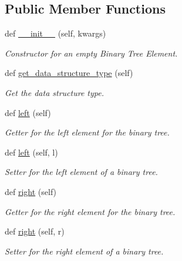\subsection*{Public Member Functions}
\begin{DoxyCompactItemize}
\item 
def \mbox{\hyperlink{classbridges_1_1bin__tree__element_1_1_bin_tree_element_ae08e007089e36e3128f45bb29cd001ec}{\+\_\+\+\_\+init\+\_\+\+\_\+}} (self, kwargs)
\begin{DoxyCompactList}\small\item\em Constructor for an empty Binary Tree Element. \end{DoxyCompactList}\item 
def \mbox{\hyperlink{classbridges_1_1bin__tree__element_1_1_bin_tree_element_a974adfbdb569d77586ecf145197b448b}{get\+\_\+data\+\_\+structure\+\_\+type}} (self)
\begin{DoxyCompactList}\small\item\em Get the data structure type. \end{DoxyCompactList}\item 
def \mbox{\hyperlink{classbridges_1_1bin__tree__element_1_1_bin_tree_element_adb99f8052ef772be4c280970e47e6e0d}{left}} (self)
\begin{DoxyCompactList}\small\item\em Getter for the left element for the binary tree. \end{DoxyCompactList}\item 
def \mbox{\hyperlink{classbridges_1_1bin__tree__element_1_1_bin_tree_element_a8c3fb48d81700421f87a439b030d34fa}{left}} (self, l)
\begin{DoxyCompactList}\small\item\em Setter for the left element of a binary tree. \end{DoxyCompactList}\item 
def \mbox{\hyperlink{classbridges_1_1bin__tree__element_1_1_bin_tree_element_adb7eaa3c67233aa5c368e8907043f451}{right}} (self)
\begin{DoxyCompactList}\small\item\em Getter for the right element for the binary tree. \end{DoxyCompactList}\item 
def \mbox{\hyperlink{classbridges_1_1bin__tree__element_1_1_bin_tree_element_a8a009b8fe2744859abc8bfe89ccce697}{right}} (self, r)
\begin{DoxyCompactList}\small\item\em Setter for the right element of a binary tree. \end{DoxyCompactList}\end{DoxyCompactItemize}
